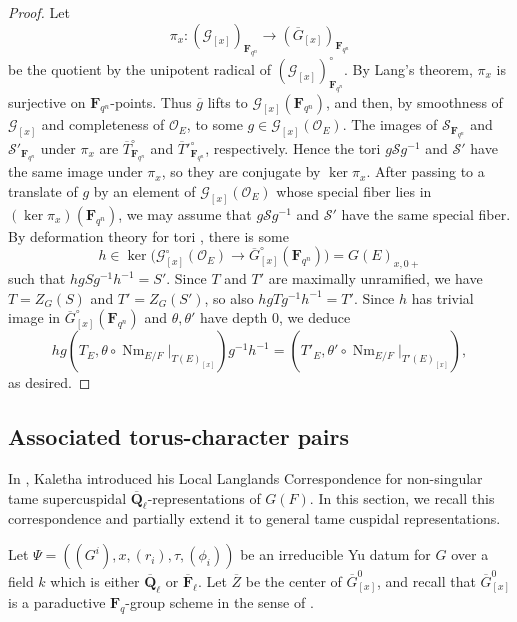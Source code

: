 \documentclass[reqno]{amsart}
\numberwithin{equation}{subsection}
\newcommand{\F}{\mathbf{F}}
\newcommand{\Q}{\mathbf{Q}}
\newcommand{\ol}[1]{\overline{#1}}
\newcommand{\co}{\colon}
\newcommand\cG{\mathcal{G}}
\newcommand\cO{\mathcal{O}}
\newcommand\cS{\mathcal{S}}
\DeclareMathOperator{\Nm}{Nm}
\theoremstyle{remark}
\numberwithin{equation}{subsection}
\numberwithin{figure}{subsection}
\begin{document}
\begin{proof}
Let
\[
    \pi_x\co(\cG_{[x]})_{\F_{q^n}}\longrightarrow(\ol G_{[x]})_{\F_{q^n}}
\]
be the quotient by the unipotent radical of $(\cG_{[x]})_{\F_{q^n}}^\circ$. By Lang's theorem, $\pi_x$ is surjective on $\F_{q^n}$-points. Thus $\ol g$ lifts to $\cG_{[x]}(\F_{q^n})$, and then, by smoothness of $\cG_{[x]}$ and completeness of $\cO_E$, to some $g\in\cG_{[x]}(\cO_E)$. The images of $\cS_{\F_{q^n}}$ and $\cS'_{\F_{q^n}}$ under $\pi_x$ are $\ol T^\circ_{\F_{q^n}}$ and $\ol T'^\circ_{\F_{q^n}}$, respectively. Hence the tori $g\cS g^{-1}$ and $\cS'$ have the same image under $\pi_x$, so they are conjugate by $\ker\pi_x$. After passing to a translate of $g$ by an element of $\cG_{[x]}(\cO_E)$ whose special fiber lies in $(\ker \pi_x)(\F_{q^n})$, we may assume that $g\cS g^{-1}$ and $\cS'$ have the same special fiber. By deformation theory for tori \cite[Exp.\ IX, Corollaire 7.3]{SGA3II}, there is some
\[
    h\in\ker\bigl(\cG_{[x]}^\circ(\cO_E)\to\ol G_{[x]}^\circ(\F_{q^n})\bigr)
    =G(E)_{x,0+}
\]
such that $hgSg^{-1}h^{-1}=S'$. Since $T$ and $T'$ are maximally unramified, we have $T = Z_G(S)$ and $T' = Z_G(S')$, so also $hg T g^{-1}h^{-1} = T'$. Since $h$ has trivial image in $\ol G_{[x]}^\circ(\F_{q^n})$ and $\theta,\theta'$ have depth $0$, we deduce
\[
hg(T_E, \theta \circ \Nm_{E/F}|_{T(E)_{[x]}})g^{-1}h^{-1} = (T'_E, \theta' \circ \Nm_{E/F}|_{T'(E)_{[x]}}),
\]
as desired.
\end{proof}


\subsection{Associated torus-character pairs}\label{ss:kal-param}

In \cite{Kal21b}, Kaletha introduced his Local Langlands Correspondence for non-singular tame supercuspidal $\ol\Q_\ell$-representations of $G(F)$. In this section, we recall this correspondence and partially extend it to general tame cuspidal representations.

Let $\Psi = ((G^i), x, (r_i), \tau, (\phi_i))$ be an irreducible Yu datum for $G$ over a field $k$ which is either $\ol\Q_\ell$ or $\ol\F_\ell$. Let $\ol Z$ be the center of $\ol G^0_{[x]}$, and recall that $\ol G^0_{[x]}$ is a paraductive $\F_q$-group scheme in the sense of \cite[Definition~2.1.1]{Cot26b}.
\end{document}
